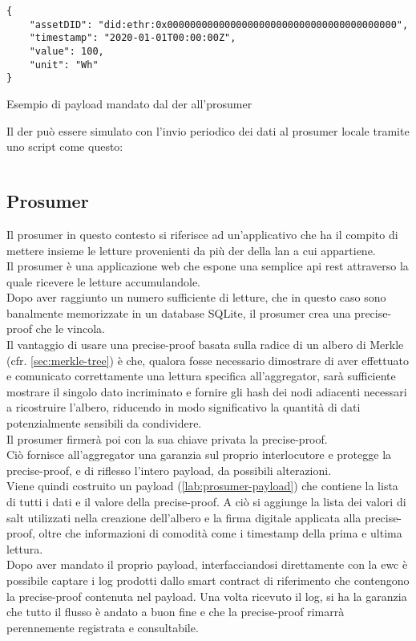 \begin{listing}
    \begin{verbatim}
{
    "assetDID": "did:ethr:0x0000000000000000000000000000000000000000",
    "timestamp": "2020-01-01T00:00:00Z",
    "value": 100,
    "unit": "Wh"
}
\end{verbatim}
    \caption{Esempio di payload mandato dal \gls{der} all'\gls{prosumer}}\label{lab:der-payload}
\end{listing}

Il \gls{der} può essere simulato con l'invio periodico dei dati al \gls{prosumer} locale tramite uno script come questo:
\inputminted[linenos]{bash}{../der/iot_source.sh}

\subsection{Prosumer}
Il \gls{prosumer} in questo contesto si riferisce ad un'applicativo che ha il compito
di mettere insieme le letture provenienti da più \gls{der} della \gls{lan} a cui appartiene. \\
Il \gls{prosumer} è una applicazione web che espone una semplice \gls{api} \gls{rest} attraverso la quale ricevere le letture accumulandole. \\
Dopo aver raggiunto un numero sufficiente di letture, che in questo caso sono banalmente memorizzate in un database
SQLite\cite{sftw:sqlite}, il \gls{prosumer} crea una precise-proof che le vincola. \\
Il vantaggio di usare una precise-proof basata sulla radice di un albero di Merkle (cfr. \autoref{sec:merkle-tree}) è che,
qualora fosse necessario dimostrare di aver effettuato e comunicato correttamente una lettura specifica all'\gls{aggregator},
sarà sufficiente mostrare il singolo dato incriminato e fornire gli hash dei nodi adiacenti necessari a ricostruire l'albero,
riducendo in modo significativo la quantità di dati potenzialmente sensibili da condividere. \\
Il \gls{prosumer} firmerà poi con la sua chiave privata la precise-proof. \\
Ciò fornisce all'\gls{aggregator} una garanzia sul proprio interlocutore e protegge la precise-proof, e di riflesso l'intero payload,
da possibili alterazioni. \\
Viene quindi costruito un payload (\autoref{lab:prosumer-payload}) che contiene la lista di tutti i dati e il valore della precise-proof.
A ciò si aggiunge la lista dei valori di salt utilizzati nella creazione dell'albero e la firma digitale applicata alla precise-proof, oltre che informazioni di comodità
come i timestamp della prima e ultima lettura. \\
Dopo aver mandato il proprio payload, interfacciandosi direttamente con la \gls{ewc} è possibile captare i log prodotti dallo smart contract di riferimento
che contengono la precise-proof contenuta nel payload.
Una volta ricevuto il log, si ha la garanzia che tutto il flusso è andato a buon fine e che la precise-proof rimarrà perennemente registrata e consultabile.

